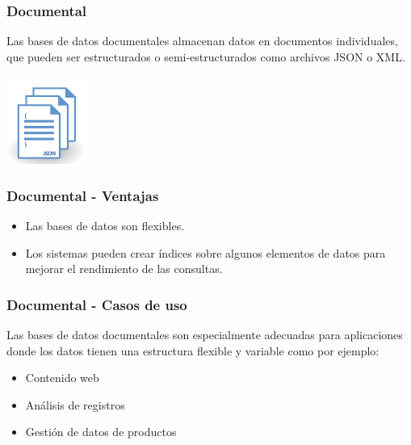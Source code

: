 \begin{frame}
    \frametitle{Documental}

    Las bases de datos documentales almacenan datos en documentos individuales, que pueden ser estructurados o semi-estructurados como archivos JSON o XML.
    
    \begin{center}
    \includegraphics[width=0.2\textwidth]{diagramas/Documental.png}
    \end{center}
\end{frame}

\begin{frame}
    \frametitle{Documental - Ventajas}

    \begin{itemize}
        \item Las bases de datos son flexibles.  
        \item Los sistemas pueden crear índices sobre algunos elementos de datos para mejorar el rendimiento de las consultas.
    \end{itemize}
\end{frame}

\begin{frame}
    \frametitle{Documental - Casos de uso}
    Las bases de datos documentales son especialmente adecuadas para aplicaciones donde los datos tienen una estructura flexible y variable como por ejemplo:
    
     
    
    \begin{itemize}
        \item Contenido web  
        \item Análisis de registros  
        \item Gestión de datos de productos
    \end{itemize}
\end{frame}

